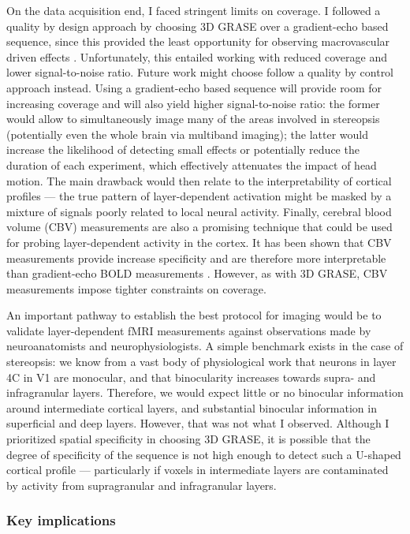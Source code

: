 On the data acquisition end, I faced stringent limits on coverage. I followed a quality by design approach by choosing 3D GRASE over a gradient-echo based sequence, since this provided the least opportunity for observing macrovascular driven effects \cite{DeMartino:2013qy}. Unfortunately, this entailed working with reduced coverage and lower signal-to-noise ratio. Future work might choose follow a quality by control approach instead. Using a gradient-echo based sequence will provide room for increasing coverage and will also yield higher signal-to-noise ratio: the former would allow to simultaneously image many of the areas involved in stereopsis (potentially even the whole brain via multiband imaging); the latter would increase the likelihood of detecting small effects or potentially reduce the duration of each experiment, which effectively attenuates the impact of head motion. The main drawback would then relate to the interpretability of cortical profiles --- the true pattern of layer-dependent activation might be masked by a mixture of signals poorly related to local neural activity. Finally, cerebral blood volume (CBV) measurements are also a promising technique that could be used for probing layer-dependent activity in the cortex. It has been shown that CBV measurements provide increase specificity and are therefore more interpretable than gradient-echo BOLD measurements \cite{Huber:2015ao}. However, as with 3D GRASE, CBV measurements impose tighter constraints on coverage.

An important pathway to establish the best protocol for imaging would be to validate layer-dependent fMRI measurements against observations made by neuroanatomists and neurophysiologists. A simple benchmark exists in the case of stereopsis: we know from a vast body of physiological work that neurons in layer 4C in V1 are monocular, and that binocularity increases towards supra- and infragranular layers. Therefore, we would expect little or no binocular information around intermediate cortical layers, and substantial binocular information in superficial and deep layers. However, that was not what I observed. Although I prioritized spatial specificity in choosing 3D GRASE, it is possible that the degree of specificity of the sequence is not high enough to detect such a U-shaped cortical profile --- particularly if voxels in intermediate layers are contaminated by activity from supragranular and infragranular layers.


\subsubsection*{Key implications}


